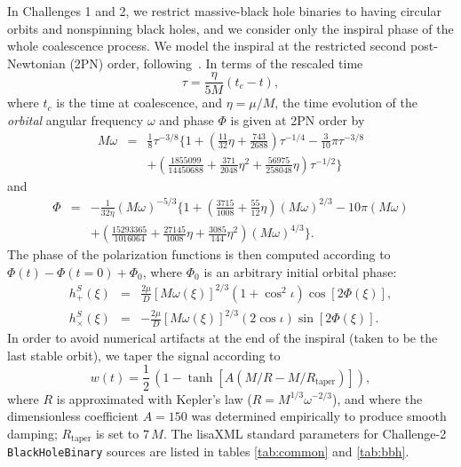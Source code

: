 \documentclass{iopart}
\def\be{\begin{equation}}
\def\ee{\end{equation}}
\def\bea{\begin{eqnarray}}
\def\eea{\end{eqnarray}}
\begin{document}
In Challenges 1 and 2, we restrict massive-black hole binaries to having circular orbits and nonspinning black holes, and we consider only the inspiral phase of the whole coalescence process. We model the inspiral at the restricted second post-Newtonian (2PN) order, following~\cite{Blanchet,DIS}. In terms of the rescaled time
\be
\tau =  \frac{\eta}{5M}(t_c - t),
\ee
where $t_c$ is the time at coalescence, and $\eta = \mu/M$, the time evolution of the \emph{orbital} angular frequency $\omega$ and phase $\Phi$ is given at 2PN order by
\bea
M\omega &=& \frac{1}{8} \tau^{-3/8}\Biggl\{ 1 + \left( \frac{11}{32}\eta + \frac{743}{2688}\right) 
\tau^{-1/4} - \frac{3}{10}\pi\tau^{-3/8} \nonumber \\
& & + \left(\frac{1855099}{14450688} + \frac{371}{2048}\eta^2 
+ \frac{56975}{258048}\eta\right)
\tau^{-1/2}  \Biggr\}
\label{fr}
\eea
and
\bea
\Phi &=& -\frac{1}{32\eta}(M\omega)^{-5/3}\Biggl\{ 1 + \left( \frac{3715}{1008} + \frac{55}{12}\eta\right)
(M\omega)^{2/3} - 10\pi(M\omega)  \nonumber \\
&& + \left( \frac{15293365}{1016064} + \frac{27145}{1008}\eta + \frac{3085}{144}\eta^2\right)
(M\omega)^{4/3}\Biggr\}.
\label{eq:Phi}
\eea
The phase of the polarization functions is then computed according to $\Phi(t) - \Phi(t = 0) + \Phi_0$, where $\Phi_0$ is an arbitrary initial orbital phase:
%
\begin{eqnarray}
h^S_{+}(\xi) &=& \frac{2\mu}{D}[M\omega(\xi)]^{2/3}(1+\cos^2 \iota)\cos [2\Phi(\xi)], \\
h^S_{\times}(\xi) &=& -\frac{2\mu}{D}[M\omega(\xi)]^{2/3}(2 \cos \iota) \sin [2\Phi(\xi)]. 
\end{eqnarray}
%
In order to avoid numerical artifacts at the end of the inspiral (taken to be the last stable orbit), we taper the signal according to
%
\begin{equation}
w(t) = \frac{1}{2}\,\left( 1 - \tanh\left[A (M/R - M/R_\mathrm{taper})\right] \right),
\end{equation}
%
where $R$ is approximated with Kepler's law ($R = M^{1/3} \omega^{-2/3}$), and
where the dimensionless coefficient $A = 150$ was determined empirically to produce smooth damping; $R_\mathrm{taper}$ is set to $7\, M$. The lisaXML standard parameters for Challenge-2 \texttt{BlackHoleBinary} sources are listed in tables \ref{tab:common} and \ref{tab:bbh}.
%
\end{document}
